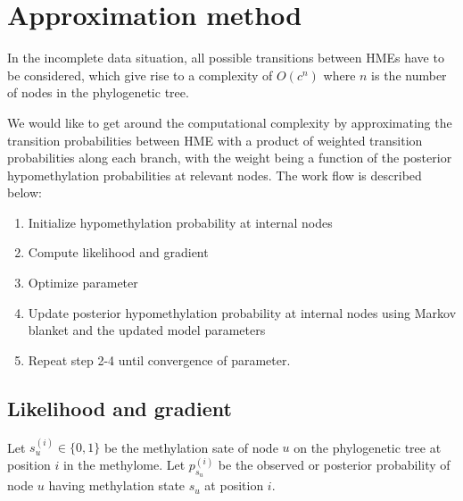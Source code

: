 \documentclass[11pt]{article}
\begin{document}
\section{Approximation method}
In the incomplete data situation, all possible transitions between HMEs
have to be considered, which give rise to a complexity of $O(c^n)$ where
$n$ is the number of nodes in the phylogenetic tree.

We would like to get around the computational complexity by
approximating the transition probabilities between HME with a product
of weighted transition probabilities along each branch, with the
weight being a function of the posterior hypomethylation probabilities
at relevant nodes. The work flow is described below:
\begin{enumerate}
\item Initialize hypomethylation probability at internal nodes
\item Compute likelihood and gradient
\item Optimize parameter
\item Update posterior hypomethylation probability at internal nodes using
Markov blanket and the updated model parameters
\item Repeat step 2-4 until convergence of parameter.
\end{enumerate}


\subsection{Likelihood and gradient}
Let $s^{(i)}_u\in\{0,1\}$ be the methylation sate of node $u$ on the
phylogenetic tree at position $i$ in the methylome.  Let
$p^{(i)}_{s_u}$ be the observed or posterior probability of node $u$
having methylation state $s_u$ at position $i$.
\end{document}
